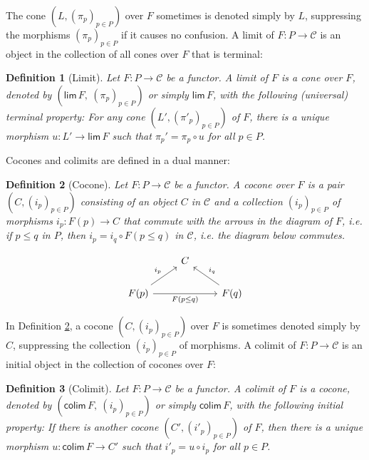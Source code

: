 \documentclass[11pt]{article}
\theoremstyle{plain}%
\newtheorem{definition}{Definition}[section]
\newcommand{\Pb}{P}
\newcommand{\Cb}{{\mathcal C}}
\newcommand{\limproj}{\mathsf{lim}}
\newcommand{\colim}{\mathsf{colim}}
\begin{document}
The cone $\left(L,(\pi_p)_{p\in \Pb}\right)$ over $F$ sometimes is denoted simply by $L$, suppressing the morphisms $(\pi_p)_{p\in \Pb}$ if it causes no confusion. A limit of $F:\Pb\rightarrow \Cb$ is an object in the collection of all cones over $F$ that is terminal: 


\begin{definition}[Limit]\label{def:limit} Let $F:\Pb\rightarrow \Cb$ be a functor. A \emph{limit} of $F$ is a cone over $F$, denoted by $\left(\limproj\, F,\ (\pi_p)_{p\in \Pb} \right)$ or simply $\limproj\, F$, with the following (universal) \emph{terminal} property: 
For any cone $\left(L',(\pi'_p)_{p\in \Pb} \right)$ of $F$, there is a \emph{unique} morphism $u:L'\rightarrow \limproj\, F$ such that $\pi_p'=\pi_p\circ u$ for all $p\in \Pb$.
\end{definition}

Cocones and colimits are defined in a dual manner:
\begin{definition}[Cocone]\label{def:cocone} Let $F:\Pb\rightarrow \Cb$ be a functor. A \emph{cocone} over $F$ is a pair $\left(C,(i_p)_{p\in \Pb}\right)$ consisting of an object $C$ in $\Cb$ and a collection $(i_p)_{p\in \Pb}$ of morphisms $i_p:F(p)\rightarrow C$ that commute with the arrows in the diagram of $F$, i.e. if $p\leq q$ in $\Pb$, then $i_p= i_q\circ F(p\leq q)$ in $\Cb$, i.e. the diagram below commutes.
\end{definition}
\begin{equation}\label{eq:cocone commutativity}
    \begin{tikzcd}
&C\\
F(p)\arrow{ru}{i_p}\arrow{rr}[swap]{F(p\leq q)}&&F(q)\arrow{lu}[swap]{i_q}
\end{tikzcd}
\end{equation}

In Definition \ref{def:cocone}, a cocone $\left(C,(i_p)_{p\in \Pb}\right)$ over $F$ is sometimes denoted simply by $C$, suppressing the collection $(i_p)_{p\in \Pb}$ of morphisms. A colimit of $F:\Pb\rightarrow \Cb$ is an initial object in the collection of cocones over $F$:

\begin{definition}[Colimit]\label{def:colimit}Let $F:\Pb\rightarrow \Cb$ be a functor. A \emph{colimit} of $F$ is a cocone, denoted by $\left(\colim\, F,\ (i_p)_{p\in \Pb}\right)$ or simply $\colim\, F$, with the following \emph{initial} property: If there is another cocone $\left(C', (i'_p)_{p\in \Pb}\right)$ of $F$, then there is a \emph{unique} morphism $u:\colim\, F\rightarrow C'$  such that $i'_p=u\circ i_p$ for all $p\in \Pb$.
\end{definition}
\end{document}
